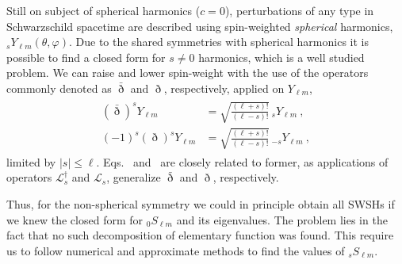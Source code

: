 Still on subject of spherical harmonics ($c=0$), perturbations of any type in Schwarzschild spacetime are described using spin-weighted \emph{spherical} harmonics, ${}_{s}Y_{\ell m}(\theta,\varphi)$.
Due to the shared symmetries with spherical harmonics it is possible to find a closed form for $s\ne0$ harmonics, which is a well studied problem.
We can raise and lower spin-weight with the use of the operators commonly denoted as $\bar{\eth}$ and $\eth$, respectively, applied on $Y_{\ell m}$,
\begin{align}
    \begin{split}
        (\bar{\eth})^s Y_{\ell m} &= \sqrt{\frac{(\ell+s)!}{(\ell-s)!}} \,{}_{s}Y_{\ell m}  ~, \\
        (-1)^s  (\eth)^s Y_{\ell m} &= \sqrt{\frac{(\ell+s)!}{(\ell-s)!}} \,{}_{-s}Y_{\ell m} ~,
    \end{split}
\end{align}
limited by $|s|\le\ell$.
Eqs.~ and~ are closely related to former, as applications of operators $\mathscr{L}^\dagger_s$ and $\mathscr{L}_s$, generalize $\bar{\eth}$ and $\eth$, respectively. 

Thus, for the non-spherical symmetry we could in principle obtain all SWSHs if we knew the closed form for ${}_{0}S_{\ell m}$ and its eigenvalues. The problem lies in the fact that no such decomposition of elementary function was found. This require us to follow numerical and approximate methods to find the values of ${}_{s}S_{\ell m}$.

